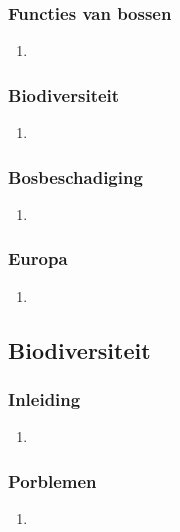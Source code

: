 \documentclass[12pt]{article}
\begin{document}
    \subsubsection{Functies van bossen}
    \begin{enumerate}
        \item 
    \end{enumerate}

    \subsubsection{Biodiversiteit}
    \begin{enumerate}
        \item 
    \end{enumerate}

    \subsubsection{Bosbeschadiging}
    \begin{enumerate}
        \item 
    \end{enumerate}

    \subsubsection{Europa}
    \begin{enumerate}
        \item 
    \end{enumerate}


    \subsection{Biodiversiteit}
    \subsubsection{Inleiding}
    \begin{enumerate}
        \item 
    \end{enumerate}

    \subsubsection{Porblemen}
    \begin{enumerate}
        \item 
    \end{enumerate}
\end{document}
